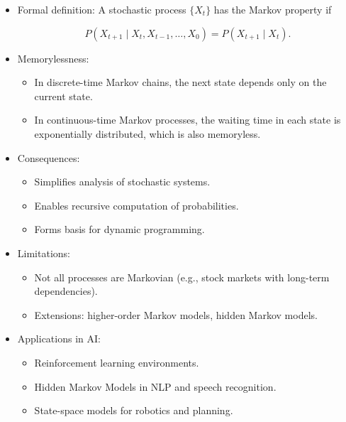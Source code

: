 \documentclass[
  letterpaper,
  DIV=11,
  numbers=noendperiod]{scrreprt}
\providecommand{\tightlist}{%
  \setlength{\itemsep}{0pt}\setlength{\parskip}{0pt}}
\begin{document}
\begin{itemize}
\item
  Formal definition: A stochastic process \(\{X_t\}\) has the Markov
  property if

  \[
  P(X_{t+1} \mid X_t, X_{t-1}, \ldots, X_0) = P(X_{t+1} \mid X_t).
  \]
\item
  Memorylessness:

  \begin{itemize}
  \tightlist
  \item
    In discrete-time Markov chains, the next state depends only on the
    current state.
  \item
    In continuous-time Markov processes, the waiting time in each state
    is exponentially distributed, which is also memoryless.
  \end{itemize}
\item
  Consequences:

  \begin{itemize}
  \tightlist
  \item
    Simplifies analysis of stochastic systems.
  \item
    Enables recursive computation of probabilities.
  \item
    Forms basis for dynamic programming.
  \end{itemize}
\item
  Limitations:

  \begin{itemize}
  \tightlist
  \item
    Not all processes are Markovian (e.g., stock markets with long-term
    dependencies).
  \item
    Extensions: higher-order Markov models, hidden Markov models.
  \end{itemize}
\item
  Applications in AI:

  \begin{itemize}
  \tightlist
  \item
    Reinforcement learning environments.
  \item
    Hidden Markov Models in NLP and speech recognition.
  \item
    State-space models for robotics and planning.
  \end{itemize}
\end{itemize}
\end{document}
